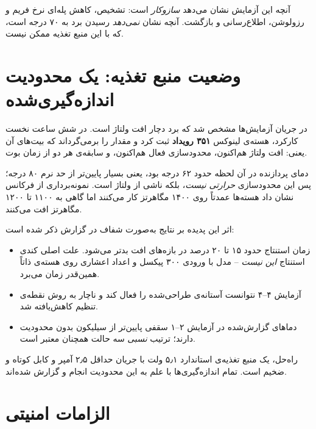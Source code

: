 آنچه این آزمایش نشان می‌دهد \emph{سازوکار} است: تشخیص، کاهش پله‌ای نرخ فریم و رزولوشن، اطلاع‌رسانی و بازگشت. آنچه نشان \emph{نمی‌دهد} رسیدن برد به ۷۰ درجه است، که با این منبع تغذیه ممکن نیست.

\section{وضعیت منبع تغذیه: یک محدودیت اندازه‌گیری‌شده}

در جریان آزمایش‌ها مشخص شد که برد دچار افت ولتاژ است. در شش ساعت نخست کارکرد، هسته‌ی لینوکس \textbf{۳۵۱ رویداد } ثبت کرد و  مقدار  را برمی‌گرداند که بیت‌های آن یعنی: افت ولتاژ هم‌اکنون، محدودسازی فعال هم‌اکنون، و سابقه‌ی هر دو از زمان بوت.

دمای پردازنده در آن لحظه حدود ۶۲ درجه بود، یعنی بسیار پایین‌تر از حد نرم ۸۰ درجه؛ پس این محدودسازی \emph{حرارتی نیست}، بلکه ناشی از ولتاژ است. نمونه‌برداری از فرکانس نشان داد هسته‌ها عمدتاً روی ۱۴۰۰ مگاهرتز کار می‌کنند اما گاهی به ۱۱۰۰ تا ۱۲۰۰ مگاهرتز افت می‌کنند.

اثر این پدیده بر نتایج به‌صورت شفاف در گزارش ذکر شده است:

\begin{itemize}
	\item زمان استنتاج حدود ۱۵ تا ۲۰ درصد در بازه‌های افت بدتر می‌شود. علت اصلی کندی استنتاج \emph{این نیست} -- مدل  با ورودی ۳۰۰ پیکسل و اعداد اعشاری روی هسته‌ی  ذاتاً همین‌قدر زمان می‌برد.
	\item آزمایش ۴--۴ نتوانست آستانه‌ی طراحی‌شده را فعال کند و ناچار به روش نقطه‌ی تنظیم کاهش‌یافته شد.
	\item دماهای گزارش‌شده در آزمایش ۲--۱ سقفی پایین‌تر از سیلیکون بدون محدودیت دارند؛ ترتیب \emph{نسبی} سه حالت همچنان معتبر است.
\end{itemize}

راه‌حل، یک منبع تغذیه‌ی استاندارد ۵٫۱ ولت با جریان حداقل ۲٫۵ آمپر و کابل کوتاه و ضخیم است. تمام اندازه‌گیری‌ها با علم به این محدودیت انجام و گزارش شده‌اند.

\section{الزامات امنیتی}

